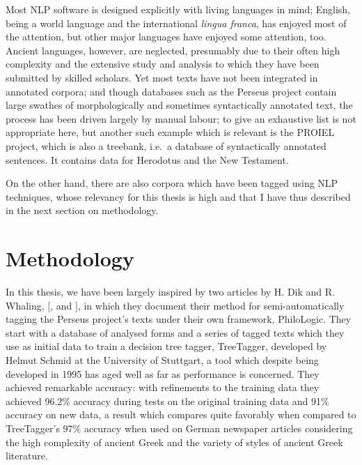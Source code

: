\documentclass[10pt,a4paper,twoside,openright,titlepage,fleqn,%
               headinclude,,footinclude,BCOR5mm,%
               numbers=noenddot,cleardoublepage=empty,%
               tablecaptionabove]{scrbook}
\begin{document}
Most NLP software is designed explicitly with living languages in mind;
English, being a world language and the international \textit{lingua franca},
has enjoyed most of the attention, but other major languages have enjoyed some
attention, too. Ancient languages, however, are neglected, presumably due to
their often high complexity and the extensive study and analysis to which they
have been submitted by skilled scholars. Yet most texts have not been
integrated in annotated corpora; and though databases such as the Perseus
project contain large swathes of morphologically and sometimes syntactically
annotated text, the process has been driven largely by manual labour; to give
an exhaustive list is not appropriate here, but another such example which is
relevant is the PROIEL project, which is also a treebank, i.e.\ a database of
syntactically annotated sentences. It contains data for Herodotus and the New Testament.

On the other hand, there are also corpora which have been tagged using NLP
techniques, whose relevancy for this thesis is high and that I have thus
described in the next section on methodology.

\section{Methodology}

In this thesis, we have been largely inspired by two articles by H. Dik and R.
Whaling, [\citeauthor{dik2008}, \citeyear{dik2008} and \citeyear{dik2009}], in
which they document their method for semi-automatically tagging the Perseus
project's texts under their own framework, PhiloLogic. They start with a
database of analysed forms and a series of tagged texts which they use as
initial data to train a decision tree tagger, TreeTagger, developed by Helmut
Schmid at the University of Stuttgart, a tool which despite being developed in
1995 has aged well as far as performance is concerned. They achieved remarkable
accuracy: with refinements to the training data they achieved 96.2\% accuracy
during tests on the original training data and 91\% accuracy on new data, a
result which compares quite favorably when compared to TreeTagger's 97\%
accuracy when used on German newspaper articles considering the high complexity
of ancient Greek and the variety of styles of ancient Greek literature.
\end{document}
